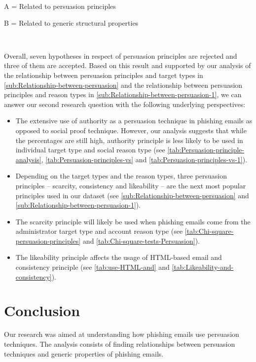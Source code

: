 {\footnotesize{}A = Related to persuasion principles}{\footnotesize \par}

{\footnotesize{}B = Related to generic structural properties}{\footnotesize \par}

\  

Overall, seven hypotheses in respect of persuasion principles are
rejected and three of them are accepted. Based on this result and
supported by our analysis of the relationship between persuasion principles
and target types in \autoref{sub:Relationship-between-persuasion}
and the relationship between persuasion principles and reason types
in \autoref{sub:Relationship-between-persuasion-1}, we can answer
our second research question with the following underlying perspectives:
\begin{itemize}
\item The extensive use of authority as a persuasion technique in phishing
emails as opposed to social proof technique. However, our analysis
suggests that while the percentages are still high, authority principle
is less likely to be used in individual target type and social reason
type (see \autoref{tab:Persuasion-principle-analysis}, \autoref{tab:Persuasion-principles-vs}
and \autoref{tab:Persuasion-principles-vs-1}).
\item Depending on the target types and the reason types, three persuasion
principles -- scarcity, consistency and likeability -- are the next
most popular principles used in our dataset (see \autoref{sub:Relationship-between-persuasion}
and \autoref{sub:Relationship-between-persuasion-1}).
\item The scarcity principle will likely be used when phishing emails come
from the administrator target type and account reason type (see \autoref{tab:Chi-square-persuasion-principles}
and \autoref{tab:Chi-square-tests-Persuasion}).
\item The likeability principle affects the usage of HTML-based email and
consistency principle (see \autoref{tab:use-HTML-and} and \autoref{tab:Likeability-and-consistency}).
\end{itemize}

\section{Conclusion}

Our research was aimed at understanding how phishing emails use persuasion
techniques. The analysis consists of finding relationships between
persuasion techniques and generic properties of phishing emails.

